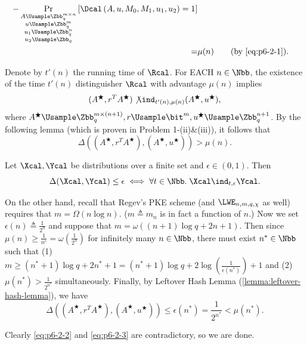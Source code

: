 \begin{answer}[ii]
\begin{align*}
{        -\Pr_{\substack{A\Usample\Zbb_q^{m\times n}\\u\Usample\Zbb_q^m\\u_1\Usample\Zbb_q^n\\u_2\Usample\Zbb_q}}\left[\Dcal\left(A, u, M_0, M_1, u_1, u_2\right)=1\right]}\\
        =&\mu(n) \qquad \textrm{(by \eqref{eq:p6-2-1})}.
    \end{align*}

    Denote by $t'(n)$ the running time of $\Rcal$. For EACH $n\in\Nbb$, the existence of the time $t'(n)$ distinguisher $\Rcal$ with advantage $\mu(n)$ implies \[(A^\bigstar, r^TA^\bigstar) \not\ind_{t'(n), \mu(n)} (A^\bigstar, u^\bigstar),\] where $A^\bigstar\Usample\Zbb_q^{m\times (n+1)}, r\Usample\bit^m, u^\bigstar\Usample\Zbb_q^{n+1}$. By the following lemma (which is proven in Problem 1-(ii)\&(iii)), it follows that
    \begin{equation}\label{eq:p6-2-2}
        \Delta\left((A^\bigstar, r^TA^\bigstar),(A^\bigstar, u^\bigstar)\right) \gt \mu(n).
    \end{equation}

    \begin{lemma*}
        Let $\Xcal, \Ycal$ be distributions over a finite set and $\epsilon\in (0,1)$. Then
        \[
            \Delta(\Xcal, \Ycal)\le \epsilon \iff \forall t\in\Nbb. \; \Xcal\ind_{t, \epsilon} \Ycal.
        \]
    \end{lemma*}

    On the other hand, recall that Regev's PKE scheme (and $\LWE_{n,m,q,\chi}$ as well) requires that $m=\Omega(n\log n)$. ($m\triangleq m_n$ is in fact a function of $n$.) Now we set $\epsilon(n)\triangleq \frac{1}{2^n}$ and suppose that $m=\omega\left((n+1)\log q+2n+1\right)$. Then since $\mu(n)\ge \frac{1}{n^c}=\omega(\frac{1}{2^n})$ for infinitely many $n\in\Nbb$, there must exist $n^\ast\in\Nbb$ such that
    (1) $m\ge (n^\ast+1)\log q+2n^\ast+1= (n^\ast+1)\log q+2\log(\frac{1}{\epsilon(n^\ast)})+1$ and (2) $\mu(n^\ast)\gt \frac{1}{2^{n^\ast}}$ simultaneously. Finally, by Leftover Hash Lemma (\autoref{lemma:leftover-hash-lemma}), we have
    \begin{equation}\label{eq:p6-2-3}
        \Delta\left((A^\bigstar, r^TA^\bigstar),(A^\bigstar, u^\bigstar)\right) \le \epsilon(n^\ast)=\frac{1}{2^{n^\ast}} \lt \mu(n^\ast).
    \end{equation}

    Clearly \eqref{eq:p6-2-2} and \eqref{eq:p6-2-3} are contradictory, so we are done.
\end{answer}